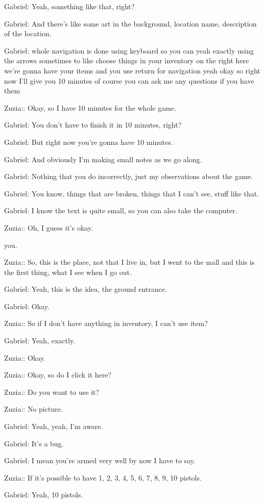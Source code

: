 Gabriel: Yeah, something like that, right?

Gabriel: And there's like some art in the background, location name, description of the location.

Gabriel: whole navigation is done using keyboard so you can yeah exactly using the arrows sometimes to like choose things in your inventory on the right here we're gonna have your items and you use return for navigation yeah okay so right now I'll give you 10 minutes of course you can ask me any questions if you have them

Zuzia:: Okay, so I have 10 minutes for the whole game.

Gabriel: You don't have to finish it in 10 minutes, right?

Gabriel: But right now you're gonna have 10 minutes.

Gabriel: And obviously I'm making small notes as we go along.

Gabriel: Nothing that you do incorrectly, just my observations about the game.

Gabriel: You know, things that are broken, things that I can't see, stuff like that.

Gabriel: I know the text is quite small, so you can also take the computer.

Zuzia:: Oh, I guess it's okay.

you.

Zuzia:: So, this is the place, not that I live in, but I went to the mall and this is the first thing, what I see when I go out.

Gabriel: Yeah, this is the idea, the ground entrance.

Gabriel: Okay.

Zuzia:: So if I don't have anything in inventory, I can't use item?

Gabriel: Yeah, exactly.

Zuzia:: Okay.

Zuzia:: Okay, so do I click it here?

Zuzia:: Do you want to use it?

Zuzia:: No picture.

Gabriel: Yeah, yeah, I'm aware.

Gabriel: It's a bug.

Gabriel: I mean you're armed very well by now I have to say.

Zuzia:: If it's possible to have 1, 2, 3, 4, 5, 6, 7, 8, 9, 10 pistols.

Gabriel: Yeah, 10 pistols.

